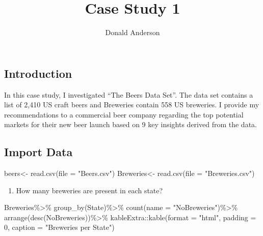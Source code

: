 \documentclass[
]{article}
\title{Case Study 1}
\author{Donald Anderson}
\date{}
\newenvironment{Shaded}{\begin{snugshade}}{\end{snugshade}}
\newcommand{\AttributeTok}[1]{\textcolor[rgb]{0.77,0.63,0.00}{#1}}
\newcommand{\DecValTok}[1]{\textcolor[rgb]{0.00,0.00,0.81}{#1}}
\newcommand{\FunctionTok}[1]{\textcolor[rgb]{0.00,0.00,0.00}{#1}}
\newcommand{\NormalTok}[1]{#1}
\newcommand{\OtherTok}[1]{\textcolor[rgb]{0.56,0.35,0.01}{#1}}
\newcommand{\SpecialCharTok}[1]{\textcolor[rgb]{0.00,0.00,0.00}{#1}}
\newcommand{\StringTok}[1]{\textcolor[rgb]{0.31,0.60,0.02}{#1}}
\providecommand{\tightlist}{%
  \setlength{\itemsep}{0pt}\setlength{\parskip}{0pt}}
\begin{document}
\maketitle

\hypertarget{introduction}{%
\subsection{Introduction}\label{introduction}}

In this case study, I investigated ``The Beers Data Set''. The data set
contains a list of 2,410 US craft beers and Breweries contain 558 US
breweries. I provide my recommendations to a commercial beer company
regarding the top potential markets for their new beer launch based on 9
key insights derived from the data.

\hypertarget{import-data}{%
\subsection{Import Data}\label{import-data}}

\begin{Shaded}
\begin{Highlighting}[]
\NormalTok{beers}\OtherTok{\textless{}{-}} \FunctionTok{read.csv}\NormalTok{(}\AttributeTok{file =} \StringTok{"Beers.csv"}\NormalTok{)}
\NormalTok{Breweries}\OtherTok{\textless{}{-}} \FunctionTok{read.csv}\NormalTok{(}\AttributeTok{file =} \StringTok{"Breweries.csv"}\NormalTok{)}
\end{Highlighting}
\end{Shaded}

\begin{enumerate}
\def\labelenumi{\arabic{enumi}.}
\tightlist
\item
  How many breweries are present in each state?
\end{enumerate}

\begin{Shaded}
\begin{Highlighting}[]
\NormalTok{Breweries}\SpecialCharTok{\%\textgreater{}\%}
  \FunctionTok{group\_by}\NormalTok{(State)}\SpecialCharTok{\%\textgreater{}\%}
  \FunctionTok{count}\NormalTok{(}\AttributeTok{name =} \StringTok{"NoBreweries"}\NormalTok{)}\SpecialCharTok{\%\textgreater{}\%}
  \FunctionTok{arrange}\NormalTok{(}\FunctionTok{desc}\NormalTok{(NoBreweries))}\SpecialCharTok{\%\textgreater{}\%}
\NormalTok{  kableExtra}\SpecialCharTok{::}\FunctionTok{kable}\NormalTok{(}\AttributeTok{format =} \StringTok{"html"}\NormalTok{, }\AttributeTok{padding =} \DecValTok{0}\NormalTok{, }\AttributeTok{caption =} \StringTok{"Breweries per State"}\NormalTok{)}
\end{Highlighting}
\end{Shaded}
\end{document}
